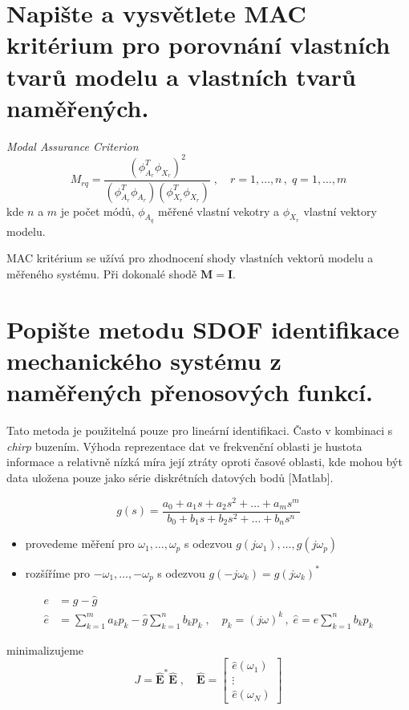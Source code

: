\documentclass{article}
\begin{document}
	\section{Napište a vysvětlete MAC kritérium pro porovnání vlastních tvarů modelu a vlastních tvarů naměřených. }
	\emph{Modal Assurance Criterion}
	\begin{equation}
	M_{rq} = \frac{(\phi_{A_r}^T \phi_{X_r})^2}{(\phi_{A_r}^T\phi_{A_r})(\phi_{X_r}^T\phi_{X_r})}
	\;,\quad 
	r = 1,\dots,n \,,\; q = 1,\dots,m
	\end{equation}
	kde $n$ a $m$ je počet módů, $\phi_{A_q}$ měřené vlastní vekotry a $\phi_{X_r}$ vlastní vektory modelu.

	MAC kritérium se užívá pro zhodnocení shody vlastních vektorů modelu a měřeného systému. Při dokonalé shodě $\bm{M} = \bm{I}$.

	\section{Popište metodu SDOF identifikace mechanického systému z naměřených přenosových funkcí. }
	Tato metoda je použitelná pouze pro lineární identifikaci. Často v kombinaci s \emph{chirp} buzením. Výhoda reprezentace dat ve frekvenční oblasti je hustota informace a relativně nízká míra její ztráty oproti časové oblasti, kde mohou být data uložena pouze jako série diskrétních datových bodů [Matlab].

	\begin{equation}
		g(s) = \frac{a_0 + a_1 s + a_2 s^2 + \dots + a_m s^m}{b_0 + b_1 s + b_2 s^2 + \dots + b_n s^n}
	\end{equation}

	\begin{itemize}
	\item provedeme měření pro $\omega_1, \dots, \omega_p$ s odezvou $g(j\omega_1),\dots,g(j\omega_p)$
	\item rozšíříme pro $-\omega_1, \dots, -\omega_p$ s odezvou $g(-j\omega_k)=g(j\omega_k)^*$
	\end{itemize}

	\begin{align}
		e &= g-\hat{g} \\
		\hat{e} &= \sum_{k=1}^m a_{k} p_{k} - \hat{g} \sum_{k=1}^n b_{k} p_{k}
		\;,\quad p_{k}=(j\omega)^k \,,\; \hat{e} = e\sum_{k=1}^n b_{k} p_{k}
	\end{align}

	minimalizujeme
	\begin{equation}
	J = \bm{\hat{E}}^*\bm{\hat{E}}
	\;,\quad 
	\bm{\hat{E}}
	=
	\begin{bmatrix}
		\hat{e}(\omega_1) \\
		\vdots \\
		\hat{e}(\omega_N)
	\end{bmatrix}
	\end{equation}
\end{document}
